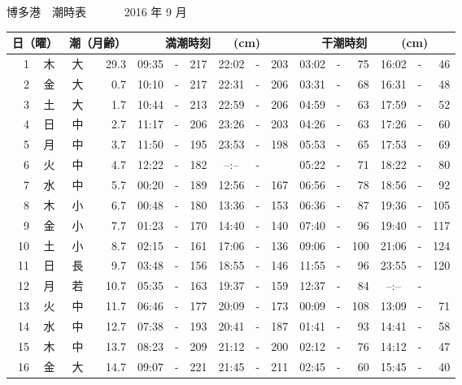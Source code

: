 \documentclass[12pt.a4j]{jsarticle}
\begin{document}
\pagestyle{empty}
 \begin{center}
 {\LARGE 博多港　潮時表　　　}
 {\large 2016 年  9 月}\\
 \begin{table}[ht]
    \begin{tabular}{|rc|cr|ccrccr|ccrccr|}
    \hline
    \multicolumn{2}{|c|}{日（曜）} & \multicolumn{2}{c|}{潮（月齢）} & \multicolumn{6}{c|}{満潮時刻　　(cm)} & \multicolumn{6}{c|}{干潮時刻　　　(cm)} \\
 \hline
 1 & 木 & 大 & 29.3 &  09:35 &-& 217  &  22:02 &-& 203  &   03:02 &-&  75  &   16:02 &-&  46  \\
 2 & 金 & 大 &  0.7 &  10:10 &-& 217  &  22:31 &-& 206  &   03:31 &-&  68  &   16:31 &-&  48  \\
 3 & 土 & 大 &  1.7 &  10:44 &-& 213  &  22:59 &-& 206  &   04:59 &-&  63  &   17:59 &-&  52  \\
 4 & 日 & 中 &  2.7 &  11:17 &-& 206  &  23:26 &-& 203  &   04:26 &-&  63  &   17:26 &-&  60  \\
 5 & 月 & 中 &  3.7 &  11:50 &-& 195  &  23:53 &-& 198  &   05:53 &-&  65  &   17:53 &-&  69  \\
 6 & 火 & 中 &  4.7 &  12:22 &-& 182  &  --:-- &-&     &   05:22 &-&  71  &   18:22 &-&  80  \\
 7 & 水 & 中 &  5.7 &  00:20 &-& 189  &  12:56 &-& 167  &   06:56 &-&  78  &   18:56 &-&  92  \\
 8 & 木 & 小 &  6.7 &  00:48 &-& 180  &  13:36 &-& 153  &   06:36 &-&  87  &   19:36 &-& 105  \\
 9 & 金 & 小 &  7.7 &  01:23 &-& 170  &  14:40 &-& 140  &   07:40 &-&  96  &   19:40 &-& 117  \\
10 & 土 & 小 &  8.7 &  02:15 &-& 161  &  17:06 &-& 136  &   09:06 &-& 100  &   21:06 &-& 124  \\
11 & 日 & 長 &  9.7 &  03:48 &-& 156  &  18:55 &-& 146  &   11:55 &-&  96  &   23:55 &-& 120  \\
12 & 月 & 若 & 10.7 &  05:35 &-& 163  &  19:37 &-& 159  &   12:37 &-&  84  &   --:-- &-&     \\
13 & 火 & 中 & 11.7 &  06:46 &-& 177  &  20:09 &-& 173  &   00:09 &-& 108  &   13:09 &-&  71  \\
14 & 水 & 中 & 12.7 &  07:38 &-& 193  &  20:41 &-& 187  &   01:41 &-&  93  &   14:41 &-&  58  \\
15 & 木 & 中 & 13.7 &  08:23 &-& 209  &  21:12 &-& 200  &   02:12 &-&  76  &   14:12 &-&  47  \\
16 & 金 & 大 & 14.7 &  09:07 &-& 221  &  21:45 &-& 211  &   02:45 &-&  60  &   15:45 &-&  40  \\

\end{tabular}
\end{table}
\end{center}
\end{document}

